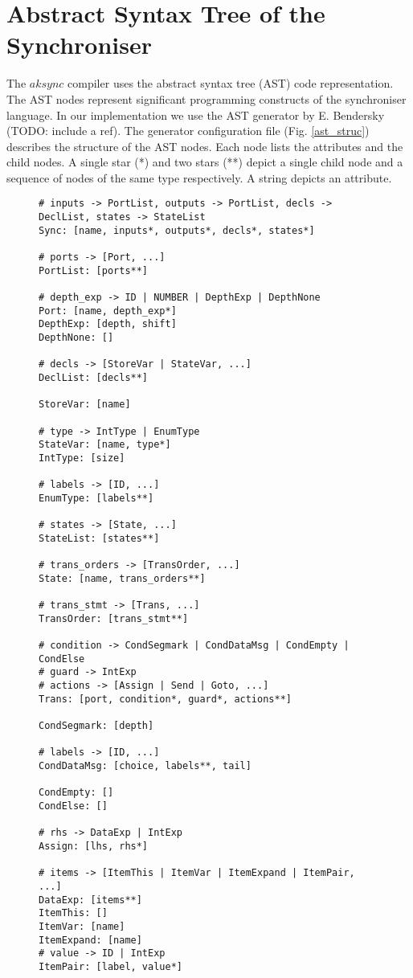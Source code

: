     \section{Abstract Syntax Tree of the Synchroniser} \label{ast_app}
The $aksync$ compiler uses the abstract syntax tree (AST) code representation. The AST nodes represent significant programming constructs of the synchroniser language. In our implementation we use the AST generator by E. Bendersky (TODO: include a ref). The generator configuration file (Fig. \ref{ast_struc}) describes the structure of the AST nodes. Each node lists the attributes and the child nodes. A single star (*) and two stars (**) depict a single child node and a sequence of nodes of the same type respectively. A string depicts an attribute.

\begin{figure}%
\scriptsize
\begin{lstlisting}[frame=single]
# inputs -> PortList, outputs -> PortList, decls -> DeclList, states -> StateList
Sync: [name, inputs*, outputs*, decls*, states*]

# ports -> [Port, ...]
PortList: [ports**]

# depth_exp -> ID | NUMBER | DepthExp | DepthNone
Port: [name, depth_exp*]
DepthExp: [depth, shift]
DepthNone: []

# decls -> [StoreVar | StateVar, ...]
DeclList: [decls**]

StoreVar: [name]

# type -> IntType | EnumType
StateVar: [name, type*]
IntType: [size]

# labels -> [ID, ...]
EnumType: [labels**]

# states -> [State, ...]
StateList: [states**]

# trans_orders -> [TransOrder, ...]
State: [name, trans_orders**]

# trans_stmt -> [Trans, ...]
TransOrder: [trans_stmt**]

# condition -> CondSegmark | CondDataMsg | CondEmpty | CondElse
# guard -> IntExp
# actions -> [Assign | Send | Goto, ...]
Trans: [port, condition*, guard*, actions**]

CondSegmark: [depth]

# labels -> [ID, ...]
CondDataMsg: [choice, labels**, tail]

CondEmpty: []
CondElse: []

# rhs -> DataExp | IntExp
Assign: [lhs, rhs*]

# items -> [ItemThis | ItemVar | ItemExpand | ItemPair, ...]
DataExp: [items**]
ItemThis: []
ItemVar: [name]
ItemExpand: [name]
# value -> ID | IntExp
ItemPair: [label, value*]


\end{lstlisting}
\end{figure}
